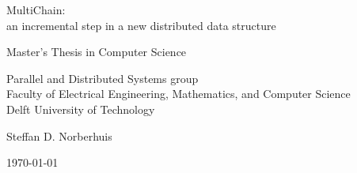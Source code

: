 \begin{titlepage}

  \begin{center}
  \null\vfill
    \begin{center}
    \LARGE{MultiChain:\\
		an incremental step in a new distributed data structure}
    \end{center}

    \vspace{3cm}

    \begin{large}
    Master's Thesis in Computer Science
    \end{large}

    \vspace{1.5cm}

    \begin{normalsize}
    Parallel and Distributed Systems group\\
    Faculty of Electrical Engineering, Mathematics, and Computer Science\\
    Delft University of Technology
    \end{normalsize}

    \vspace{2.0cm}

    \begin{normalsize}
    Steffan D. Norberhuis
    \end{normalsize}

    \vspace{1.0cm}

    \today            %

  \vfill
  \end{center}

\end{titlepage}

